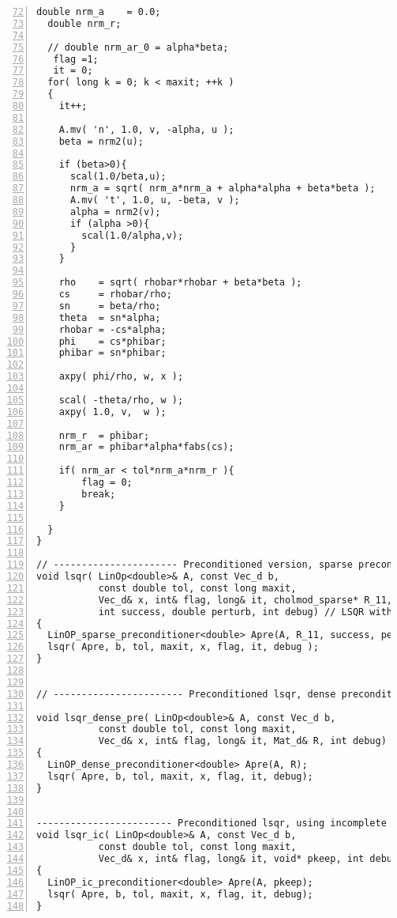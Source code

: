 \documentclass[english,11pt]{article}
\begin{document}
\begin{lstlisting}[numbers=left, firstnumber = 72]
  double nrm_a    = 0.0;
  double nrm_r;
  
  // double nrm_ar_0 = alpha*beta;
   flag =1;
   it = 0;
  for( long k = 0; k < maxit; ++k )
  {
    it++;

    A.mv( 'n', 1.0, v, -alpha, u );
    beta = nrm2(u);

    if (beta>0){
      scal(1.0/beta,u);      
      nrm_a = sqrt( nrm_a*nrm_a + alpha*alpha + beta*beta );
      A.mv( 't', 1.0, u, -beta, v );
      alpha = nrm2(v);
      if (alpha >0){
        scal(1.0/alpha,v);    
      }
    }

    rho    = sqrt( rhobar*rhobar + beta*beta );
    cs     = rhobar/rho;
    sn     = beta/rho;
    theta  = sn*alpha;
    rhobar = -cs*alpha;
    phi    = cs*phibar;
    phibar = sn*phibar;

    axpy( phi/rho, w, x );

    scal( -theta/rho, w );
    axpy( 1.0, v,  w );

    nrm_r  = phibar;
    nrm_ar = phibar*alpha*fabs(cs);

    if( nrm_ar < tol*nrm_a*nrm_r ){
        flag = 0;
        break;
    }

  }
}

// ---------------------- Preconditioned version, sparse preconditioner ------------------------------//
void lsqr( LinOp<double>& A, const Vec_d b,
           const double tol, const long maxit,
           Vec_d& x, int& flag, long& it, cholmod_sparse* R_11, 
           int success, double perturb, int debug) // LSQR with preconditioner
{
  LinOP_sparse_preconditioner<double> Apre(A, R_11, success, perturb);
  lsqr( Apre, b, tol, maxit, x, flag, it, debug );
}


// ----------------------- Preconditioned lsqr, dense preconditioner ----------------------//

void lsqr_dense_pre( LinOp<double>& A, const Vec_d b,
           const double tol, const long maxit,
           Vec_d& x, int& flag, long& it, Mat_d& R, int debug) // LSQR with preconditioner
{
  LinOP_dense_preconditioner<double> Apre(A, R);
  lsqr( Apre, b, tol, maxit, x, flag, it, debug);
}


------------------------ Preconditioned lsqr, using incomplete cholesky ----------//
void lsqr_ic( LinOp<double>& A, const Vec_d b,
           const double tol, const long maxit,
           Vec_d& x, int& flag, long& it, void* pkeep, int debug) // LSQR with ic preconditioner
{
  LinOP_ic_preconditioner<double> Apre(A, pkeep);
  lsqr( Apre, b, tol, maxit, x, flag, it, debug);
}
\end{lstlisting}
\end{document}
